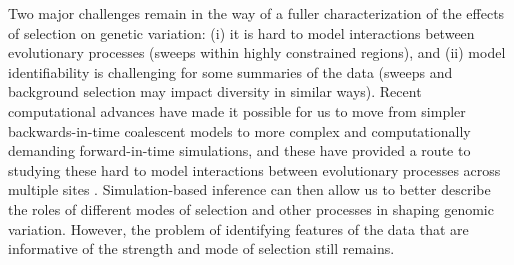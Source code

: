 Two major challenges remain in the way of a fuller characterization of the effects of selection on genetic variation:
(i) it is hard to model interactions between evolutionary processes (\eg sweeps within highly constrained regions), and 
(ii) model identifiability is challenging for some summaries of the data (\eg sweeps and background selection may impact diversity in similar ways).
Recent computational advances have made it possible for us to move from simpler backwards-in-time coalescent models \citep{hudson_testing_1983}
to more complex and computationally demanding forward-in-time simulations,
and these have provided a route to studying these hard to model interactions between evolutionary processes across multiple sites \parencite{haller_slim_2019, kelleher_efficient_2016, haller_tree-sequence_2019}.
Simulation-based inference can then allow us to better describe the roles of different modes of selection and other processes in shaping genomic variation.
However, the problem of identifying features of the data that are informative of the strength and mode of selection still remains.

